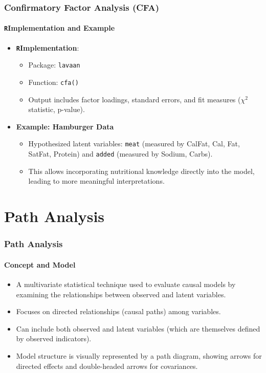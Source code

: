 \documentclass{beamer}
\newcommand{\R}{\texttt{R}}
\newcommand{\code}[1]{\texttt{#1}}
\begin{document}
\begin{frame}
    \frametitle{Confirmatory Factor Analysis (CFA)}
    \framesubtitle{\R Implementation and Example}
    \begin{itemize}
        \item \textbf{\R Implementation}:
            \begin{itemize}
                \item Package: \code{lavaan}
                \item Function: \code{cfa()}
                \item Output includes factor loadings, standard errors, and fit measures ($\chi^2$ statistic, p-value).
            \end{itemize}
        \item \textbf{Example: Hamburger Data}
            \begin{itemize}
                \item Hypothesized latent variables: \code{meat} (measured by CalFat, Cal, Fat, SatFat, Protein) and \code{added} (measured by Sodium, Carbs).
                \item This allows incorporating nutritional knowledge directly into the model, leading to more meaningful interpretations.
            \end{itemize}
    \end{itemize}
\end{frame}

\section{Path Analysis}

\begin{frame}
    \frametitle{Path Analysis}
    \framesubtitle{Concept and Model}
    \begin{itemize}
        \item A multivariate statistical technique used to evaluate \alert{causal models} by examining the relationships between observed and latent variables.
        \item Focuses on directed relationships (causal paths) among variables.
        \item Can include both observed and \alert{latent variables} (which are themselves defined by observed indicators).
        \item Model structure is visually represented by a \alert{path diagram}, showing arrows for directed effects and double-headed arrows for covariances.
    \end{itemize}
\end{frame}
\end{document}
